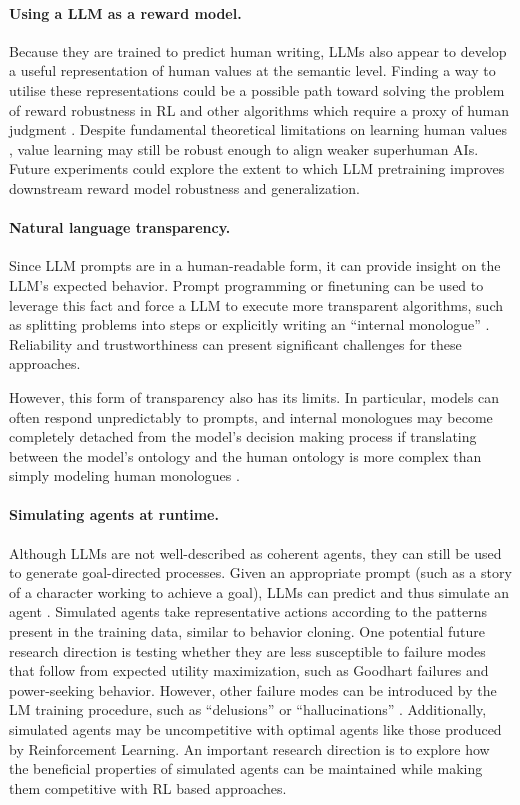 \documentclass[11pt]{article}
\begin{document}
\paragraph{Using a LLM as a reward model.} Because they are trained to predict human writing, LLMs also appear to develop a useful representation of human values at the semantic level. Finding a way to utilise these representations could be a possible path toward solving the problem of reward robustness in RL and other algorithms which require a proxy of human judgment \citep{rlhf-summ,alignment-by-default}. Despite fundamental theoretical limitations on learning human values \citep{Armstrong2018OccamsRI,irl-is-hard}, value learning may still be robust enough to align weaker superhuman AIs. Future experiments could explore the extent to which LLM pretraining improves downstream reward model robustness and generalization.

\paragraph{Natural language transparency.} Since LLM prompts are in a human-readable form, it can provide insight on the LLM’s expected behavior. Prompt programming or finetuning can be used to leverage this fact and force a LLM to execute more transparent algorithms, such as splitting problems into steps or explicitly writing an ``internal monologue'' \citep{visible-thoughts, factored-cognition,nye2021work}. Reliability and trustworthiness can present significant challenges for these approaches. 

However, this form of transparency also has its limits. In particular, models can often respond unpredictably to prompts, and internal monologues may become completely detached from the model's decision making process if translating between the model's ontology and the human ontology is more complex than simply modeling human monologues \citep{elk}.

\paragraph{Simulating agents at runtime.} Although LLMs are not well-described as coherent agents, they can still be used to generate goal-directed processes. Given an appropriate prompt (such as a story of a character working to achieve a goal), LLMs can predict and thus simulate an agent \citep{huang2022language}. Simulated agents take representative actions according to the patterns present in the training data, similar to behavior cloning. One potential future research direction is testing whether they are less susceptible to failure modes that follow from expected utility maximization, such as Goodhart failures and power-seeking behavior. However, other failure modes can be introduced by the LM training procedure, such as ``delusions'' or ``hallucinations'' \citep{ortega2021shaking,bc-miscalibrated,maynez2020faithfulness}. Additionally, simulated agents may be uncompetitive with optimal agents like those produced by Reinforcement Learning. An important research direction is to explore how the beneficial properties of simulated agents can be maintained while making them competitive with RL based approaches.
\end{document}
